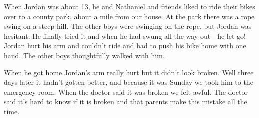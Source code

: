 When Jordan was about 13, he and Nathaniel and friends liked to ride their
bikes over to a county park, about a mile from our house. At the park there was
a rope swing on a steep hill. The other boys were swinging on the rope, but
Jordan was hesitant. He finally tried it and when he had swung all the way
out---he let go! Jordan hurt his arm and couldn't ride and had to push his bike
home with one hand. The other boys thoughtfully walked with him.

When he got home Jordan's arm really hurt but it didn't look broken. Well three
days later it hadn't gotten better, and because it was Sunday we took him to
the emergency room. When the doctor said it was broken we felt awful. The
doctor said it's hard to know if it is broken and that parents make this
mistake all the time.
